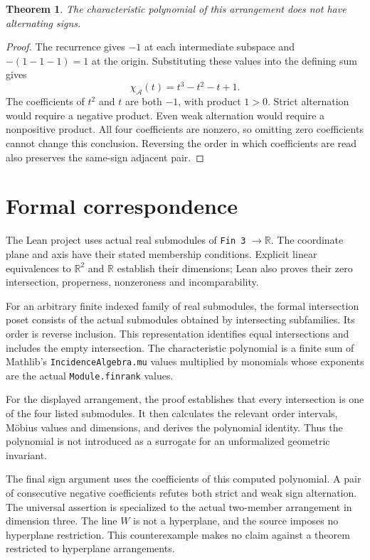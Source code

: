 \documentclass[11pt]{article}
\newtheorem{theorem}{Theorem}
\newcommand{\R}{\mathbb R}
\newcommand{\A}{\mathcal A}
\begin{document}
\clearpage
\begin{theorem}
The characteristic polynomial of this arrangement does not have alternating signs.
\end{theorem}
\begin{proof}
The recurrence gives $-1$ at each intermediate subspace and $-(1-1-1)=1$ at the origin. Substituting these values into the defining sum gives
\[
 \chi_{\A}(t)=t^3-t^2-t+1.
\]
The coefficients of $t^2$ and $t$ are both $-1$, with product $1>0$. Strict alternation would require a negative product. Even weak alternation would require a nonpositive product. All four coefficients are nonzero, so omitting zero coefficients cannot change this conclusion. Reversing the order in which coefficients are read also preserves the same-sign adjacent pair.
\end{proof}

\section{Formal correspondence}
The Lean project uses actual real submodules of \texttt{Fin 3} $\to\R$. The coordinate plane and axis have their stated membership conditions. Explicit linear equivalences to $\R^2$ and $\R$ establish their dimensions; Lean also proves their zero intersection, properness, nonzeroness and incomparability.

For an arbitrary finite indexed family of real submodules, the formal intersection poset consists of the actual submodules obtained by intersecting subfamilies. Its order is reverse inclusion. This representation identifies equal intersections and includes the empty intersection. The characteristic polynomial is a finite sum of Mathlib's \texttt{IncidenceAlgebra.mu} values multiplied by monomials whose exponents are the actual \texttt{Module.finrank} values.

For the displayed arrangement, the proof establishes that every intersection is one of the four listed submodules. It then calculates the relevant order intervals, M\"obius values and dimensions, and derives the polynomial identity. Thus the polynomial is not introduced as a surrogate for an unformalized geometric invariant.

The final sign argument uses the coefficients of this computed polynomial. A pair of consecutive negative coefficients refutes both strict and weak sign alternation. The universal assertion is specialized to the actual two-member arrangement in dimension three. The line $W$ is not a hyperplane, and the source imposes no hyperplane restriction. This counterexample makes no claim against a theorem restricted to hyperplane arrangements.
\end{document}
